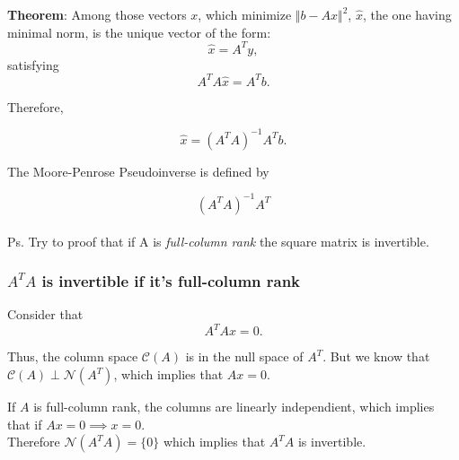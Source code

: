 \documentclass[aspectratio=169]{beamer}
\begin{document}

\begin{frame}{} %
	
	{\color{violet} \textbf{Theorem}:} Among those vectors $x$, which minimize $\Vert b - A x\Vert^2$, $\hat{x}$, the one having minimal norm, is the unique vector of the form:
	\[\hat{x}= A^Ty,\]
	\noindent satisfying
	\[ A^T A \hat{x} = A^T b. \]

Therefore, 

\[ 	\hat x = (A^T A )^{-1} A^T b.	\]

The Moore-Penrose Pseudoinverse is defined by

\[ (A^T A )^{-1} A^T \]\\

Ps. Try to proof that if A is \textit{full-column rank} the square matrix is invertible.

\end{frame}

\begin{frame}
	\frametitle{$A^T A$ is invertible if it's full-column rank }

	Consider that 
	\[  A^T A x =0.  \]
	
	Thus, the column space $\mathcal{C}(A)$ is in the null space of $A^T$. But we know that $ \mathcal{C}(A) \perp \mathcal{N}(A^T) $, which implies that $A x = 0$.



If $A$ is full-column rank, the columns are linearly independient, which implies that if $A x = 0 \implies x = 0$.\\

	Therefore $\mathcal{N}(A^T A) = \{ 0 \}$  which implies that $A^T A$ is invertible.

\end{frame}
\end{document}
